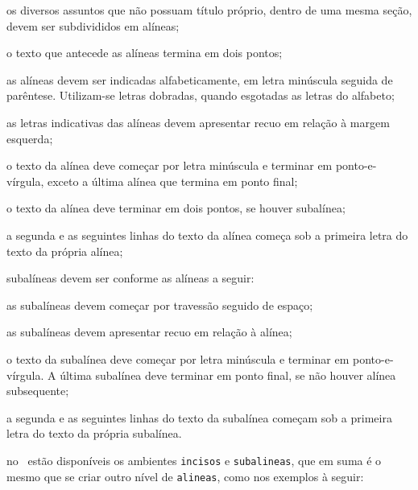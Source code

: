 \begin{alineas}

  \item os diversos assuntos que não possuam título próprio, dentro de uma mesma
  seção, devem ser subdivididos em alíneas; 
  
  \item o texto que antecede as alíneas termina em dois pontos;
  \item as alíneas devem ser indicadas alfabeticamente, em letra minúscula
  seguida de parêntese. Utilizam-se letras dobradas, quando esgotadas as
  letras do alfabeto;

  \item as letras indicativas das alíneas devem apresentar recuo em relação à
  margem esquerda;

  \item o texto da alínea deve começar por letra minúscula e terminar em
  ponto-e-vírgula, exceto a última alínea que termina em ponto final;

  \item o texto da alínea deve terminar em dois pontos, se houver subalínea;

  \item a segunda e as seguintes linhas do texto da alínea começa sob a
  primeira letra do texto da própria alínea;
  
  \item subalíneas devem ser conforme as alíneas a
  seguir:

  \begin{alineas}
     \item as subalíneas devem começar por travessão seguido de espaço;

     \item as subalíneas devem apresentar recuo em relação à alínea;

     \item o texto da subalínea deve começar por letra minúscula e terminar em
     ponto-e-vírgula. A última subalínea deve terminar em ponto final, se não
     houver alínea subsequente;

     \item a segunda e as seguintes linhas do texto da subalínea começam sob a
     primeira letra do texto da própria subalínea.
  \end{alineas}
  
  \item no \abnTeX\ estão disponíveis os ambientes \texttt{incisos} e
  \texttt{subalineas}, que em suma é o mesmo que se criar outro nível de
  \texttt{alineas}, como nos exemplos à seguir:
  

\end{alineas}
